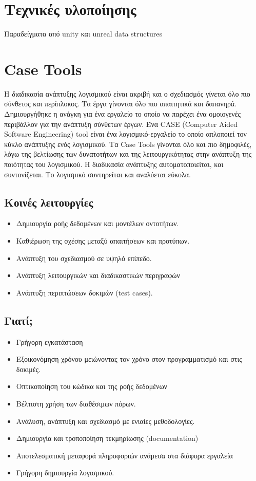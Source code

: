 \section{Τεχνικές υλοποίησης}
Παραδείγματα από unity και unreal data structures
\section{Case Tools}
Η διαδικασία ανάπτυξης λογισμικού είναι ακριβή και ο σχεδιασμός γίνεται όλο πιο σύνθετος και περίπλοκος. Τα έργα γίνονται όλο πιο απαιτητικά και δαπανηρά. Δημιουργήθηκε η ανάγκη για ένα εργαλείο το οποίο να παρέχει ένα ομοιογενές περιβάλλον για την ανάπτυξη σύνθετων έργων. 
Ένα CASE (Computer Aided Software Engineering) tool είναι ένα λογισμικό-εργαλείο το οποίο απλοποιεί τον κύκλο ανάπτυξης ενός λογισμικού. Τα Case Tools γίνονται όλο και πιο δημοφιλές, λόγω της βελτίωσης των δυνατοτήτων και της λειτουργικότητας στην ανάπτυξη της ποιότητας του λογισμικού. Η διαδικασία ανάπτυξης αυτοματοποιείται, και συντονίζεται. Το λογισμικό συντηρείται και αναλύεται εύκολα. 

\subsection{Kοινές λειτουργίες}
\begin{itemize}
	\item Δημιουργία ροής δεδομένων και μοντέλων οντοτήτων.
	\item Καθιέρωση της σχέσης μεταξύ απαιτήσεων και προτύπων.
	\item Ανάπτυξη του σχεδιασμού σε υψηλό επίπεδο.
	\item Ανάπτυξη λειτουργικών και διαδικαστικών περιγραφών
	\item Ανάπτυξη περιπτώσεων δοκιμών (test cases).	
\end{itemize}

\subsection{Γιατί;}
\begin{itemize}
	\item Γρήγορη εγκατάσταση
	\item Εξοικονόμηση χρόνου μειώνοντας τον χρόνο στον προγραμματισμό και στις δοκιμές.
	\item Οπτικοποίηση του κώδικα και της ροής δεδομένων
	\item Βέλτιστη χρήση των διαθέσιμων πόρων.
	\item Ανάλυση, ανάπτυξη και σχεδιασμό με ενιαίες μεθοδολογίες.
	\item Δημιουργία και τροποποίηση τεκμηρίωσης (documentation)
	\item Αποτελεσματική μεταφορά πληροφοριών ανάμεσα στα διάφορα εργαλεία
	\item Γρήγορη δημιουργία λογισμικού.
\end{itemize}

